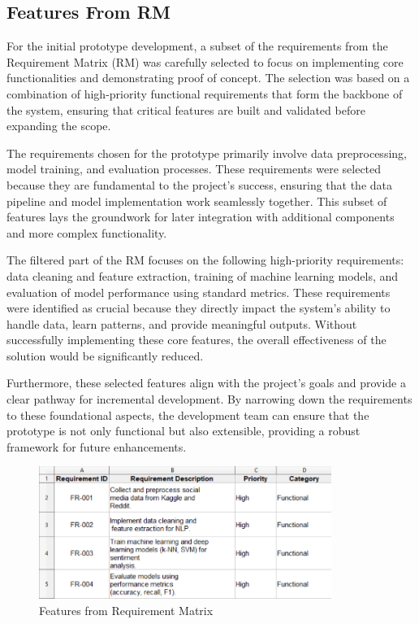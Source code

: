 \subsection{Features From RM}
\noindent
For the initial prototype development, a subset of the requirements from the Requirement Matrix (RM) was carefully selected to focus on implementing core functionalities and demonstrating proof of concept. The selection was based on a combination of high-priority functional requirements that form the backbone of the system, ensuring that critical features are built and validated before expanding the scope.

The requirements chosen for the prototype primarily involve data preprocessing, model training, and evaluation processes. These requirements were selected because they are fundamental to the project's success, ensuring that the data pipeline and model implementation work seamlessly together. This subset of features lays the groundwork for later integration with additional components and more complex functionality.

The filtered part of the RM focuses on the following high-priority requirements: data cleaning and feature extraction, training of machine learning models, and evaluation of model performance using standard metrics. These requirements were identified as crucial because they directly impact the system's ability to handle data, learn patterns, and provide meaningful outputs. Without successfully implementing these core features, the overall effectiveness of the solution would be significantly reduced.

Furthermore, these selected features align with the project’s goals and provide a clear pathway for incremental development. By narrowing down the requirements to these foundational aspects, the development team can ensure that the prototype is not only functional but also extensible, providing a robust framework for future enhancements.

\begin{figure}[h!]  
    \centering
    \includegraphics[width=0.85\textwidth]{Images/RM_part_for_implementation.png}  
    \caption{Features from Requirement Matrix}
    \label{Features from Requirement Matrix}  %
\end{figure}

